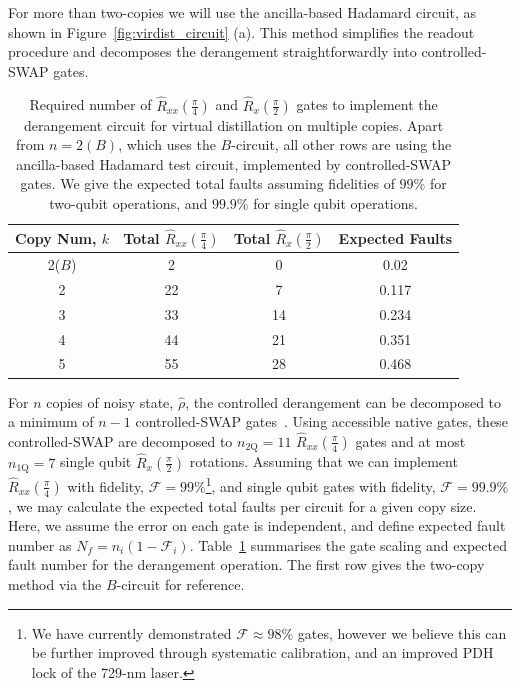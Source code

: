     For more than two-copies we will use the ancilla-based Hadamard circuit, as shown in
    Figure~\ref{fig:virdist_circuit} (a). This method simplifies the readout procedure and decomposes the derangement straightforwardly into controlled-SWAP gates.

\begin{table}
    \begin{center}
    \begin{tabular}{|c|c|c|c|}
        \hline
        Copy Num, $k$ & Total $\hat R_{xx}(\frac{\pi}{4})$ & Total $\hat R_x(\frac{\pi}{2})$ & Expected Faults \\
        \hline                                                                                                 
        2($B$) & 2 & 0 & 0.02\\
        2 & 22 & 7 & 0.117\\
        3 & 33 & 14 & 0.234\\
        4 & 44 & 21 & 0.351\\
        5 & 55 & 28 & 0.468\\
        \hline
    \end{tabular}
    \end{center}
    \caption{
        Required number of $\hat R_{xx}(\frac{\pi}{4})$ and $\hat R_x(\frac{\pi}{2})$
        gates to implement the derangement circuit for virtual distillation on
        multiple copies. Apart from $n=2(B)$, which uses the $B$-circuit, all
        other rows are using the ancilla-based Hadamard test circuit,
        implemented by controlled-SWAP gates. We give the expected total faults
        assuming fidelities of $99\%$ for two-qubit operations, and $99.9\%$ for
        single qubit operations.
        }
    \label{tab:VD_gt2}
\end{table}
    For $n$ copies of noisy state, $\hat\rho$, the controlled derangement can be
    decomposed to a minimum of $n-1$ controlled-SWAP
    gates~\cite{araki_space-time_2025-1}. Using accessible native gates, these
    controlled-SWAP are decomposed to $n_\mathrm{2Q} = 11$
    $\hat R_{xx}(\frac{\pi}{4})$ gates and at most $n_\mathrm{1Q} = 7$ single qubit
    $\hat R_x(\frac{\pi}{2})$ rotations. Assuming that we can implement
    $\hat R_{xx}(\frac{\pi}{4})$ with fidelity, $\mathcal{F} = 99\%$\footnote{We have currently demonstrated $\mathcal{F}\approx 98\%$ gates, however we believe this can be further improved through systematic calibration, and an improved PDH lock of the 729-nm laser.}, and single qubit gates
    with fidelity, $\mathcal{F}=99.9\%$, we may calculate the expected total faults per
    circuit for a given copy size. Here, we assume the error on each gate is
    independent, and define expected fault number as $N_f =
    n_i(1-\mathcal{F}_i)$. Table~\ref{tab:VD_gt2}
    summarises the gate scaling and expected fault number for the derangement
    operation. The first row gives the two-copy method via the $B$-circuit for
    reference.

